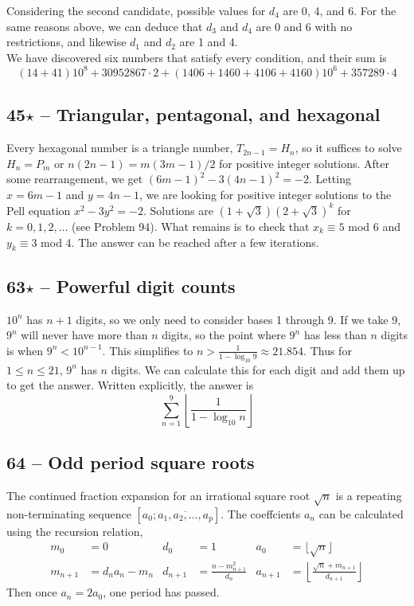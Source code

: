 \documentclass{article}
\begin{document}
Considering the second candidate, possible values for $d_4$ are 0, 4, and 6. For the same reasons above, we can deduce that $d_3$ and $d_4$ are 0 and 6 with no restrictions, and likewise $d_1$ and $d_2$ are 1 and 4. \\

We have discovered six numbers that satisfy every condition, and their sum is
\[ \boxed{ (14+41)10^8 + 30952867 \cdot 2 + (1406+1460+4106+4160)10^6 + 357289 \cdot 4 } \]

\subsection*{45$\star$ -- Triangular, pentagonal, and hexagonal} 
Every hexagonal number is a triangle number, $T_{2n-1} = H_n$, so it suffices to solve $H_n = P_m$ or $n(2n-1) = m(3m-1)/2$ for positive integer solutions. 
After some rearrangement, we get $(6m-1)^2 - 3(4n-1)^2 = -2$. 
Letting $x = 6m-1$ and $y = 4n-1$, we are looking for positive integer solutions to the Pell equation $x^2 - 3y^2 = -2$.
Solutions are $(1+\sqrt{3})(2+\sqrt{3})^k$ for $k = 0, 1, 2, \dotsc$ (see Problem 94).
What remains is to check that $x_k \equiv 5$ mod 6 and $y_k \equiv 3$ mod 4. 
The answer can be reached after a few iterations.

\subsection*{63$\star$ -- Powerful digit counts} 
$10^n$ has $n+1$ digits, so we only need to consider bases 1 through 9. 
If we take 9, $9^n$ will never have more than $n$ digits, so the point where $9^n$ has less than $n$ digits is when $9^n < 10^{n-1}$. 
This simplifies to $n > \frac{1}{1 - \log_{10}9} \approx 21.854$. 
Thus for $1 \leq n \leq 21$, $9^n$ has $n$ digits. 
We can calculate this for each digit and add them up to get the answer. Written explicitly, the answer is 
\[ \boxed{ \sum\limits_{n=1}^9 \left\lfloor \frac{1}{1 - \log_{10} n} \right\rfloor } \]

\subsection*{64 -- Odd period square roots} 
The continued fraction expansion for an irrational square root $\sqrt{n}$ is a repeating non-terminating sequence $[a_0; \overline{a_1, a_2, \dotsc, a_p}]$.
The coeffcients $a_n$ can be calculated using the recursion relation,
\begin{align*}
m_0 &= 0 & d_0 &= 1 & a_0 &= \lfloor \sqrt{n} \rfloor \\
m_{n+1} &= d_na_n - m_n  &  d_{n+1} &= \frac{n - m_{n+1}^2}{d_n} & a_{n+1} &= \left\lfloor \frac{\sqrt{n} + m_{n+1}}{d_{n+1}} \right\rfloor 
\end{align*}
Then once $a_n = 2a_0$, one period has passed.
\end{document}
